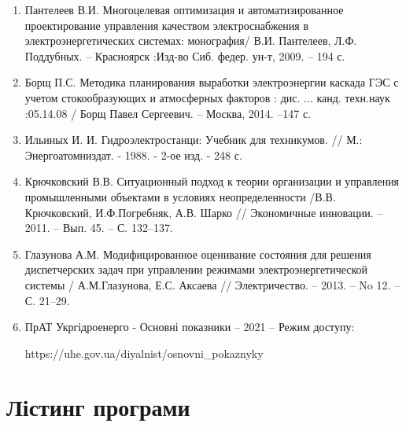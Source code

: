 \documentclass[12pt]{article}
\numberwithin{equation}{section}
\numberwithin{figure}{section}
\begin{document}
\begin{enumerate}
\item Пантелеев В.И. Многоцелевая оптимизация и автоматизированное проектирование управления качеством электроснабжения в электроэнергетических системах: монография/ В.И. Пантелеев, Л.Ф. Поддубных. – Красноярск :Изд-во Сиб. федер. ун-т, 2009. – 194 с.
\item Борщ П.С. Методика планирования выработки электроэнергии каскада ГЭС с учетом стокообразующих и атмосферных факторов : дис. ... канд. техн.наук :05.14.08 / Борщ Павел Сергеевич. – Москва, 2014. –147 с.
\item Ильиных И. И. Гидроэлектростанци: Учебник для техникумов. // М.: Энергоатомниздат. - 1988. - 2-ое изд. - 248 с.
\item Крючковский В.В. Ситуационный подход к теории организации и управления промышленными объектами в условиях неопределенности /В.В. Крючковский, И.Ф.Погребняк, А.В. Шарко // Экономичные инновации. –2011. – Вып. 45. – С. 132–137.
\item Глазунова А.М. Модифицированное оценивание состояния для решения диспетчерских задач при управлении режимами электроэнергетической системы / А.М.Глазунова, Е.С. Аксаева // Электричество. – 2013. – No 12. –С. 21–29.
\item ПрАТ Укргідроенерго - Основні показники -- 2021 -- Режим доступу:  

https://uhe.gov.ua/diyalnist/osnovni\_pokaznyky
\end{enumerate}

\section{Лістинг програми}
\end{document}
